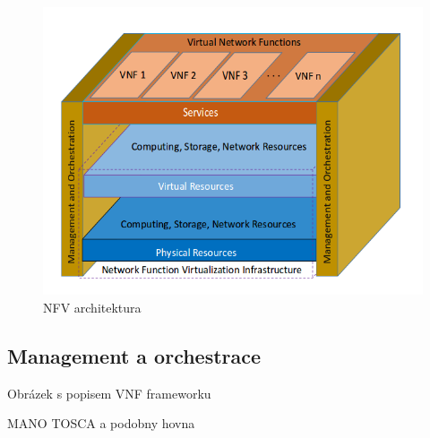 \begin{figure}[h]
\begin{centering}
\includegraphics[scale=0.5]{images/NFV_architektura}
\par\end{centering}
\caption{NFV architektura\label{fig:NFV_architektura}}
\end{figure}

\subsection{Management a orchestrace}\label{sub:interaction}

Obrázek s popisem VNF frameworku

MANO
TOSCA a podobny hovna
